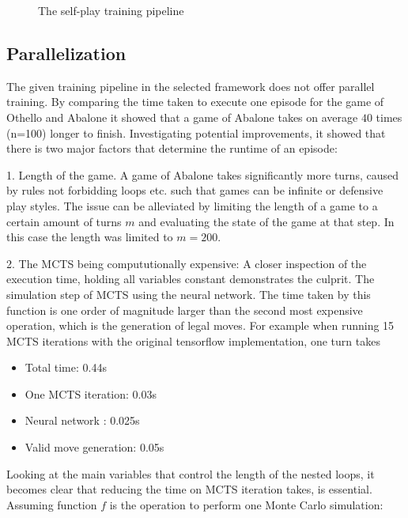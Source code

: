 \begin{figure}[!h]
    \centering
    \caption{The self-play training pipeline}
    \label{training_algorithm}
\end{figure}

\subsection{Parallelization}
The given training pipeline in the selected framework does not offer parallel training. By comparing the time taken to execute one episode for the game of Othello and Abalone it showed that a game of Abalone takes on average $40$ times (n=100) longer to finish. Investigating potential improvements, it showed that there is two major factors that determine the runtime of an episode:

1. Length of the game. A game of Abalone takes significantly more turns, caused by rules not forbidding loops etc. such that games can be infinite or defensive play styles. The issue can be alleviated by limiting the length of a game to a certain amount of turns $m$ and evaluating the state of the game at that step. In this case the length was limited to $m=200$.

2. The MCTS being compututionally expensive: A closer inspection of the execution time, holding all variables constant demonstrates the culprit. The simulation step of MCTS using the neural network. The time taken by this function is one order of magnitude larger than the second most expensive operation, which is the generation of legal moves. For example when running 15 MCTS iterations with the original tensorflow implementation, one turn takes

\begin{itemize}
    \item Total time: 0.44s
    \item One MCTS iteration: 0.03s
    \item Neural network : 0.025s
    \item Valid move generation: 0.05s
\end{itemize}

Looking at the main variables that control the length of the nested loops, it becomes clear that reducing the time on MCTS iteration takes, is essential. Assuming function $f$ is the operation to perform one Monte Carlo simulation:

